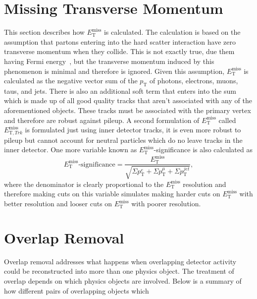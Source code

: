 \section{Missing Transverse Momentum}
\label{sec:met}
This section describes how $E_{\mathrm{T}}^{\text{miss}}$ is calculated. The
calculation is based on the assumption that partons entering into the hard
scatter interaction have zero transverse momentum when they collide. This is not
exactly true, due them having Fermi energy~\cite{fermi-energy}, but the
transverse momentum induced by this phenomenon is minimal and therefore is
ignored. Given this assumption, $E_{\mathrm{T}}^{\text{miss}}$ is calculated as
the negative vector sum of the $p_{\mathrm{T}}$ of photons, electrons, muons,
taus, and jets. There is also an additional soft term that enters into the sum
which is made up of all good quality tracks that aren't associated with any of
the aforementioned objects. These tracks must be associated with the primary
vertex and therefore are robust against pileup. A second formulation of
$E_{\mathrm{T}}^{\text{miss}}$ called $E_{\mathrm{T}, Trk}^{\text{miss}}$ is
formulated just using inner detector tracks, it is even more robust to pileup
but cannot account for neutral particles which do no leave tracks in the inner
detector. One more variable known as $E_{\mathrm{T}}^{\text{miss}}$-significance
is also calculated as
\begin{equation} E_{\mathrm{T}}^{\text{miss}}\text{-significance} =
\frac{E_{\mathrm{T}}^{\text{miss}}}{\sqrt{\Sigma p_{\mathrm{T}}^e + \Sigma
p_{\mathrm{T}}^\mu + \Sigma p_{\mathrm{T}}^{jet}}},
  \label{eq:metsig}
\end{equation} where the denominator is clearly proportional to the
$E_{\mathrm{T}}^{\text{miss}}$ resolution and therefore making cuts on this
variable simulates making harder cuts on $E_{\mathrm{T}}^{\text{miss}}$ with
better resolution and looser cuts on $E_{\mathrm{T}}^{\text{miss}}$ with poorer
resolution.

\section{Overlap Removal}
Overlap removal addresses what happens when overlapping detector activity could
be reconstructed into more than one physics object. The treatment of overlap
depends on which physics objects are involved. Below is a summary of how different
pairs of overlapping objects which


